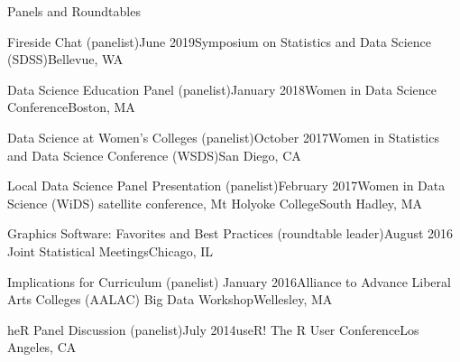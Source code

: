\documentclass{resume} %
\begin{document}
\begin{rSection}{Panels and Roundtables}

\begin{sSubsection}{Fireside Chat}{ (panelist)}{June 2019}{Symposium on Statistics and Data Science (SDSS)}{Bellevue, WA}
\end{sSubsection}

\begin{sSubsection}{Data Science Education Panel}{ (panelist)}{January 2018}{Women in Data Science Conference}{Boston, MA}
\end{sSubsection}

\begin{sSubsection}{Data Science at Women's Colleges}{ (panelist)}{October 2017}{Women in Statistics and Data Science Conference (WSDS)}{San Diego, CA}
\end{sSubsection}

\begin{sSubsection}{Local Data Science Panel Presentation}{ (panelist)}{February 2017}{Women in Data Science (WiDS) satellite conference, Mt Holyoke College}{South Hadley, MA}
\end{sSubsection}

\begin{sSubsection}{Graphics Software: Favorites and Best Practices}{ (roundtable leader)}{August 2016 }{Joint Statistical Meetings}{Chicago, IL}
\end{sSubsection}

\begin{sSubsection}{Implications for Curriculum}{ (panelist) }{January 2016}{Alliance to Advance Liberal Arts Colleges (AALAC) Big Data Workshop}{Wellesley, MA}
\end{sSubsection}

\begin{sSubsection}{heR Panel Discussion}{ (panelist)}{July 2014}{useR! The R User Conference}{Los Angeles, CA}
\end{sSubsection}


\end{rSection}
\end{document}
